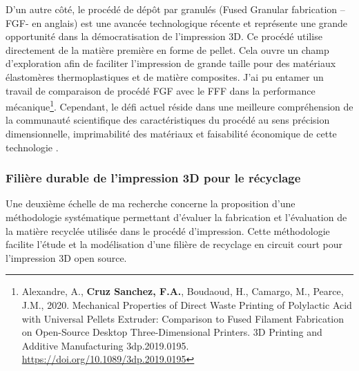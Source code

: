 \documentclass[
  11pt,
]{article}
\begin{document}
D'un autre côté, le procédé de dépôt par granulés (Fused Granular
fabrication --FGF- en anglais) est une avancée technologique récente et
représente une grande opportunité dans la démocratisation de
l'impression 3D. Ce procédé utilise directement de la matière première
en forme de pellet. Cela ouvre un champ d'exploration afin de faciliter
l'impression de grande taille pour des matériaux élastomères
thermoplastiques et de matière composites. J'ai pu entamer un travail de
comparaison de procédé FGF avec le FFF dans la performance
mécanique\footnote{Alexandre, A., \textbf{Cruz Sanchez, F.A.}, Boudaoud,
  H., Camargo, M., Pearce, J.M., 2020. Mechanical Properties of Direct
  Waste Printing of Polylactic Acid with Universal Pellets Extruder:
  Comparison to Fused Filament Fabrication on Open-Source Desktop
  Three-Dimensional Printers. 3D Printing and Additive Manufacturing
  3dp.2019.0195. \url{https://doi.org/10.1089/3dp.2019.0195}}.
Cependant, le défi actuel réside dans une meilleure compréhension de la
communauté scientifique des caractéristiques du procédé au sens
précision dimensionnelle, imprimabilité des matériaux et faisabilité
économique de cette technologie .

\hypertarget{filiuxe8re-durable-de-limpression-3d-pour-le-ruxe9cyclage}{%
\subsubsection{Filière durable de l'impression 3D pour le
récyclage}\label{filiuxe8re-durable-de-limpression-3d-pour-le-ruxe9cyclage}}

Une deuxième échelle de ma recherche concerne la proposition d'une
méthodologie systématique permettant d'évaluer la fabrication et
l'évaluation de la matière recyclée utilisée dans le procédé
d'impression. Cette méthodologie facilite l'étude et la modélisation
d'une filière de recyclage en circuit court pour l'impression 3D open
source.
\end{document}
